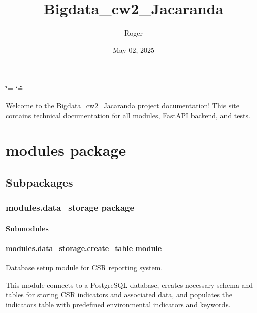 \documentclass[letterpaper,10pt,english]{sphinxmanual}
\title{Bigdata\_cw2\_Jacaranda}
\date{May 02, 2025}
\author{Roger}
\begin{document}
\ifdefined\shorthandoff
  \ifnum\catcode`\=\string=\active\shorthandoff{=}\fi
  \ifnum\catcode`\"=\active{}\fi
\fi

\pagestyle{empty}
\sphinxmaketitle
\pagestyle{plain}
\sphinxtableofcontents
\pagestyle{normal}
\label{\detokenize{index::doc}}


\sphinxAtStartPar
Welcome to the Bigdata\_cw2\_Jacaranda project documentation!
This site contains technical documentation for all modules, FastAPI backend, and tests.

\sphinxstepscope


\chapter{modules package}
\label{\detokenize{modules:modules-package}}\label{\detokenize{modules::doc}}

\section{Subpackages}
\label{\detokenize{modules:subpackages}}
\sphinxstepscope


\subsection{modules.data\_storage package}
\label{\detokenize{modules.data_storage:modules-data-storage-package}}\label{\detokenize{modules.data_storage::doc}}

\subsubsection{Submodules}
\label{\detokenize{modules.data_storage:submodules}}

\subsubsection{modules.data\_storage.create\_table module}
\label{\detokenize{modules.data_storage:module-modules.data_storage.create_table}}\label{\detokenize{modules.data_storage:modules-data-storage-create-table-module}}
\sphinxAtStartPar
Database setup module for CSR reporting system.

\sphinxAtStartPar
This module connects to a PostgreSQL database, creates necessary schema and tables
for storing CSR indicators and associated data, and populates the indicators table
with predefined environmental indicators and keywords.
\end{document}
